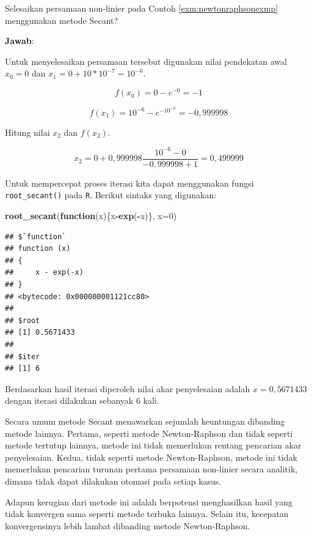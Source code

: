 \documentclass[]{book}
\newenvironment{Shaded}{\begin{snugshade}}{\end{snugshade}}
\newcommand{\ControlFlowTok}[1]{\textcolor[rgb]{0.13,0.29,0.53}{\textbf{#1}}}
\newcommand{\DataTypeTok}[1]{\textcolor[rgb]{0.13,0.29,0.53}{#1}}
\newcommand{\DecValTok}[1]{\textcolor[rgb]{0.00,0.00,0.81}{#1}}
\newcommand{\KeywordTok}[1]{\textcolor[rgb]{0.13,0.29,0.53}{\textbf{#1}}}
\newcommand{\NormalTok}[1]{#1}
\newcommand{\OperatorTok}[1]{\textcolor[rgb]{0.81,0.36,0.00}{\textbf{#1}}}
\theoremstyle{definition}
\theoremstyle{definition}
\theoremstyle{definition}
\theoremstyle{remark}
\let\BeginKnitrBlock\begin \let\EndKnitrBlock\end
\begin{document}
\BeginKnitrBlock{example}
\protect\hypertarget{exm:secantexmp}{}{\label{exm:secantexmp} }Selesaikan persamaan non-linier pada Contoh \ref{exm:newtonraphsonexmp} menggunakan metode Secant?
\EndKnitrBlock{example}

\textbf{Jawab}:

Untuk menyelesaikan persamaan tersebut digunakan nilai pendekatan awal \(x_0=0\) dan \(x_1=0+10*10^{-7}=10^{-6}\).

\[
f\left(x_0 \right)=0-e^{-0}=-1
\]

\[
f\left(x_1 \right)=10^{-6}-e^{-10^{-6}}=-0,999998
\]

Hitung nilai \(x_2\) dan \(f\left(x_2 \right)\).

\[
x_2=0+0,999998\frac{10^{-6}-0}{-0,999998+1}=0,499999
\]

Untuk mempercepat proses iterasi kita dapat menggunakan fungsi \texttt{root\_secant()} pada \texttt{R}. Berikut sintaks yang digunakan:

\begin{Shaded}
\begin{Highlighting}[]
\KeywordTok{root_secant}\NormalTok{(}\ControlFlowTok{function}\NormalTok{(x)\{x}\OperatorTok{-}\KeywordTok{exp}\NormalTok{(}\OperatorTok{-}\NormalTok{x)\}, }\DataTypeTok{x=}\DecValTok{0}\NormalTok{)}
\end{Highlighting}
\end{Shaded}

\begin{verbatim}
## $`function`
## function (x) 
## {
##     x - exp(-x)
## }
## <bytecode: 0x000000001121cc80>
## 
## $root
## [1] 0.5671433
## 
## $iter
## [1] 6
\end{verbatim}

Berdasarkan hasil iterasi diperoleh nilai akar penyelesaian adalah \(x=0,5671433\) dengan iterasi dilakukan sebanyak \(6\) kali.

Secara umum metode Secant menawarkan sejumlah keuntungan dibanding metode lainnya. Pertama, seperti metode Newton-Raphson dan tidak seperti metode tertutup lainnya, metode ini tidak memerlukan rentang pencarian akar penyelesaian. Kedua, tidak seperti metode Newton-Raphson, metode ini tidak memerlukan pencarian turunan pertama persamaan non-linier secara analitik, dimana tidak dapat dilakukan otomasi pada setiap kasus.

Adapun kerugian dari metode ini adalah berpotensi menghasilkan hasil yang tidak konvergen sama seperti metode terbuka lainnya. Selain itu, kecepatan konvergensinya lebih lambat dibanding metode Newton-Raphson.
\end{document}
